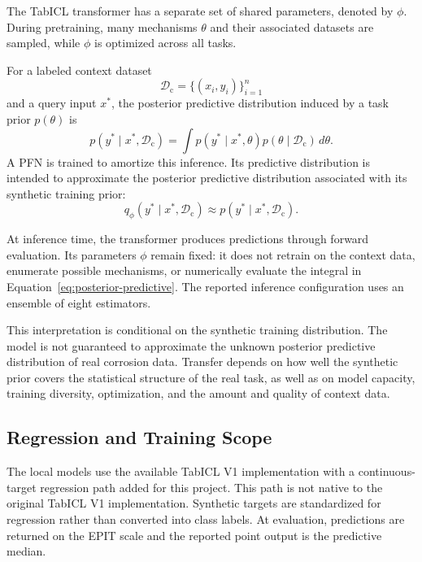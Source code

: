 \documentclass{article}
\begin{document}
The TabICL transformer has a separate set of shared parameters, denoted by
\(\phi\). During pretraining, many mechanisms \(\theta\) and their associated
datasets are sampled, while \(\phi\) is optimized across all tasks.

For a labeled context dataset
\[
\mathcal{D}_{\mathrm{c}}=\{(x_i,y_i)\}_{i=1}^{n}
\]
and a query input \(x^\ast\), the posterior predictive distribution induced
by a task prior \(p(\theta)\) is
\begin{equation}
p(y^\ast\mid x^\ast,\mathcal{D}_{\mathrm{c}})
=\int p(y^\ast\mid x^\ast,\theta)
       p(\theta\mid\mathcal{D}_{\mathrm{c}})\,d\theta.
\label{eq:posterior-predictive}
\end{equation}
A PFN is trained to amortize this inference. Its predictive distribution is
intended to approximate the posterior predictive distribution associated with
its synthetic training prior:
\begin{equation}
q_{\phi}(y^\ast\mid x^\ast,\mathcal{D}_{\mathrm{c}})
\approx p(y^\ast\mid x^\ast,\mathcal{D}_{\mathrm{c}}).
\label{eq:pfn-approximation}
\end{equation}

At inference time, the transformer produces predictions through forward
evaluation. Its parameters \(\phi\) remain fixed: it does not retrain on the
context data, enumerate possible mechanisms, or numerically evaluate the
integral in Equation~\eqref{eq:posterior-predictive}. The reported inference
configuration uses an ensemble of eight estimators.

This interpretation is conditional on the synthetic training distribution.
The model is not guaranteed to approximate the unknown posterior predictive
distribution of real corrosion data. Transfer depends on how well the
synthetic prior covers the statistical structure of the real task, as well as
on model capacity, training diversity, optimization, and the amount and
quality of context data.

\subsection{Regression and Training Scope}

The local models use the available TabICL V1 implementation with a
continuous-target regression path added for this project. This path is not
native to the original TabICL V1 implementation. Synthetic targets are
standardized for regression rather than converted into class labels. At
evaluation, predictions are returned on the EPIT scale and the reported point
output is the predictive median.
\end{document}
